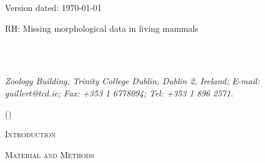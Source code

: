 \documentclass[12pt,letterpaper]{article}
\renewcommand{\section}[1]{%
\bigskip
\begin{center}
\begin{Large}
\normalfont\scshape #1
\medskip
\end{Large}
\end{center}}
\begin{document}
\begin{flushright}
Version dated: \today
\end{flushright}
\bigskip
\noindent RH: Missing morphological data in living mammals

\bigskip
\medskip
\begin{center}


\bigskip

\\
\\
\end{center}
\medskip
{} \textit{Zoology Building, Trinity College Dublin, Dublin 2, Ireland; E-mail: guillert@tcd.ie; Fax: +353 1 6778094; Tel: +353 1 896 2571.}\\
\vspace{1in}

\modulolinenumbers[1]
\linenumbers

%
%

\newpage
\begin{abstract}

\end{abstract}

\noindent ()\\

\vspace{1.5in}

\newpage 

%
%

\section{Introduction}


%
%
 
\newpage

\section{Material and Methods}
\end{document}
